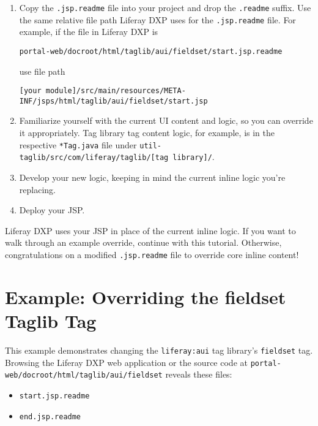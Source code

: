 \begin{enumerate}
\def\labelenumi{\arabic{enumi}.}
\setcounter{enumi}{3}
\item
  Copy the \texttt{.jsp.readme} file into your project and drop the
  \texttt{.readme} suffix. Use the same relative file path Liferay DXP
  uses for the \texttt{.jsp.readme} file. For example, if the file in
  Liferay DXP is

\begin{verbatim}
portal-web/docroot/html/taglib/aui/fieldset/start.jsp.readme
\end{verbatim}

  use file path

\begin{verbatim}
[your module]/src/main/resources/META-INF/jsps/html/taglib/aui/fieldset/start.jsp
\end{verbatim}
\item
  Familiarize yourself with the current UI content and logic, so you can
  override it appropriately. Tag library tag content logic, for example,
  is in the respective \texttt{*Tag.java} file under
  \texttt{util-taglib/src/com/liferay/taglib/{[}tag\ library{]}/}.
\item
  Develop your new logic, keeping in mind the current inline logic
  you're replacing.
\item
  Deploy your JSP.
\end{enumerate}

Liferay DXP uses your JSP in place of the current inline logic. If you
want to walk through an example override, continue with this tutorial.
Otherwise, congratulations on a modified \texttt{.jsp.readme} file to
override core inline content!

\section{Example: Overriding the fieldset Taglib
Tag}\label{example-overriding-the-fieldset-taglib-tag}

This example demonstrates changing the \texttt{liferay:aui} tag
library's \texttt{fieldset} tag. Browsing the Liferay DXP web
application or the source code at
\texttt{portal-web/docroot/html/taglib/aui/fieldset} reveals these
files:

\begin{itemize}
\tightlist
\item
  \texttt{start.jsp.readme}
\item
  \texttt{end.jsp.readme}
\end{itemize}

